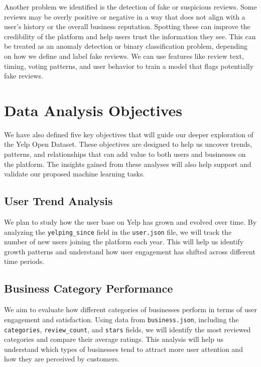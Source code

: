 \documentclass[conference]{IEEEtran}
\begin{document}
Another problem we identified is the detection of fake or suspicious reviews.
Some reviews may be overly positive or negative in a way that does not align with
a user's history or the overall business reputation. Spotting these can improve
the credibility of the platform and help users trust the information they see.
This can be treated as an anomaly detection or binary classification problem,
depending on how we define and label fake reviews. We can use features like review
text, timing, voting patterns, and user behavior to train a model that flags
potentially fake reviews.

\section{Data Analysis Objectives}

We have also defined five key objectives that will guide our deeper exploration of
the Yelp Open Dataset. These objectives are designed to help us uncover trends,
patterns, and relationships that can add value to both users and businesses on
the platform. The insights gained from these analyses will also help support
and validate our proposed machine learning tasks.

\subsection{User Trend Analysis}

We plan to study how the user base on Yelp has grown and evolved over time. By
analyzing the \texttt{yelping\_since} field in the \texttt{user.json} file, we
will track the number of new users joining the platform each year. This will help
us identify growth patterns and understand how user engagement has shifted across
different time periods.

\subsection{Business Category Performance}

We aim to evaluate how different categories of businesses perform in terms of
user engagement and satisfaction. Using data from \texttt{business.json}, including
the \texttt{categories}, \texttt{review\_count}, and \texttt{stars} fields, we
will identify the most reviewed categories and compare their average ratings.
This analysis will help us understand which types of businesses tend to attract
more user attention and how they are perceived by customers.
\end{document}
